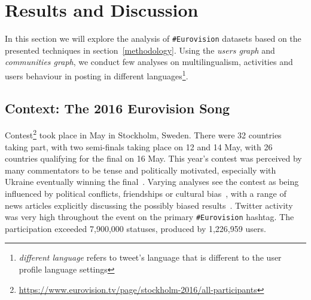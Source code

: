 \documentclass{llncs}
\begin{document}


\section{Results and Discussion}\label{results}


In this section we will explore the analysis of {\texttt{\#Eurovision}}
datasets based on the presented techniques in section~\ref{methodology}. Using
the \emph{users graph} and \emph{communities graph}, we conduct few analyses on
multilingualism, activities and users behaviour in posting in different 
languages\footnote{\emph{different language} refers to tweet's language
that is different to the user profile language settings}.

\subsection{Context: The 2016 Eurovision Song}\label{context}

Contest\footnote{\url{https://www.eurovision.tv/page/stockholm-2016/all-participants}}
took place in May in Stockholm, Sweden. There were 32 countries taking
part, with two semi-finals taking place on 12 and 14 May, with 26
countries qualifying for the final on 16 May. This year's contest was
perceived by many commentators to be tense and politically motivated,
especially with Ukraine eventually winning the
final~\cite{telegrapheuroboycott:2016}. Varying analyses see the
contest as being influenced by political conflicts, friendships or
cultural
bias~\cite{ginsburgh+noury:2008,charron:2013,blangiardo+baio:2014,budzinski+pannicke:2016},
with a range of news articles explicitly discussing the possibly
biased results~\cite{telegrapheurobias:2016}.  Twitter activity was
very high throughout the event on the primary {\texttt{\#Eurovision}}
hashtag. The participation exceeded 7,900,000 statuses, produced by
1,226,959 users.
\end{document}
